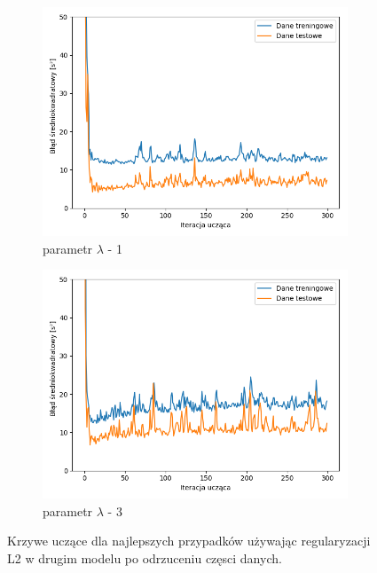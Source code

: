 \documentclass[12pt]{aghdpl}
\begin{document}
\begin{figure}[h]
		 	\begin{subfigure}{.5\linewidth}
		 		\includegraphics[width =\linewidth]{wykresy/7_badanie_danych/l2/regularyzacja_1_wykres_uczenia.png}
		 		\caption{parametr $\lambda$ - 1}
		 	\end{subfigure}
		 	\begin{subfigure}{.5\linewidth}
		 		\includegraphics[width =\linewidth]{wykresy/7_badanie_danych/l2/regularyzacja_3_wykres_uczenia.png}
		 		\caption{parametr $\lambda$ - 3}
		 	\end{subfigure}
	 	
 			\caption{Krzywe uczące dla najlepszych przypadków używając regularyzacji L2 w drugim modelu po odrzuceniu częsci danych.}
			\label{fig: drugi_model_przy_regularyzacji_l2_po_odrzuceniu_czesci_danych_wykresy_uczenia}
		\end{figure}
		
\end{document}
